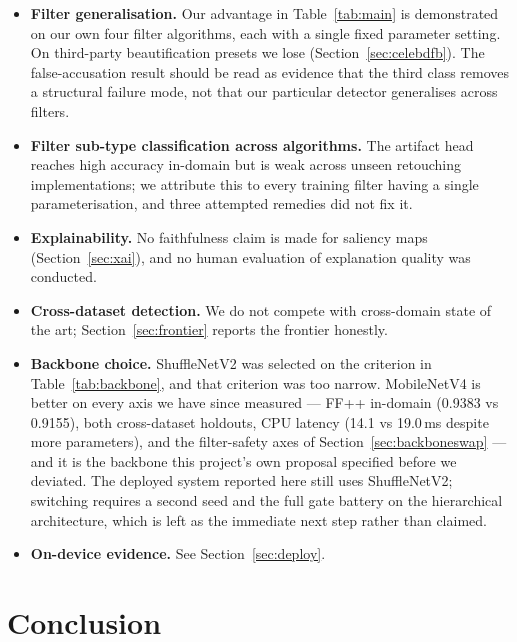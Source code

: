 \documentclass[conference]{IEEEtran}
\begin{document}
\begin{itemize}
\item \textbf{Filter generalisation.} Our advantage in Table~\ref{tab:main} is demonstrated
      on our own four filter algorithms, each with a single fixed parameter setting. On
      third-party beautification presets we lose (Section~\ref{sec:celebdfb}). The
      false-accusation result should be read as evidence that the third class removes a
      structural failure mode, not that our particular detector generalises across filters.
\item \textbf{Filter sub-type classification across algorithms.} The artifact head reaches
      high accuracy in-domain but is weak across unseen retouching implementations; we
      attribute this to every training filter having a single parameterisation, and three
      attempted remedies did not fix it.
\item \textbf{Explainability.} No faithfulness claim is made for saliency maps
      (Section~\ref{sec:xai}), and no human evaluation of explanation quality was conducted.
\item \textbf{Cross-dataset detection.} We do not compete with cross-domain state of the art;
      Section~\ref{sec:frontier} reports the frontier honestly.
\item \textbf{Backbone choice.} ShuffleNetV2 was selected on the criterion in
      Table~\ref{tab:backbone}, and that criterion was too narrow. MobileNetV4 is better on
      every axis we have since measured --- FF++ in-domain (0.9383 vs 0.9155), both
      cross-dataset holdouts, CPU latency (14.1 vs 19.0\,ms despite more parameters), and
      the filter-safety axes of Section~\ref{sec:backboneswap} --- and it is the backbone this
      project's own proposal specified before we deviated. The deployed system reported here
      still uses ShuffleNetV2; switching requires a second seed and the full gate battery on
      the hierarchical architecture, which is left as the immediate next step rather than
      claimed.
\item \textbf{On-device evidence.} See Section~\ref{sec:deploy}.
\end{itemize}

\section{Conclusion}
\end{document}
